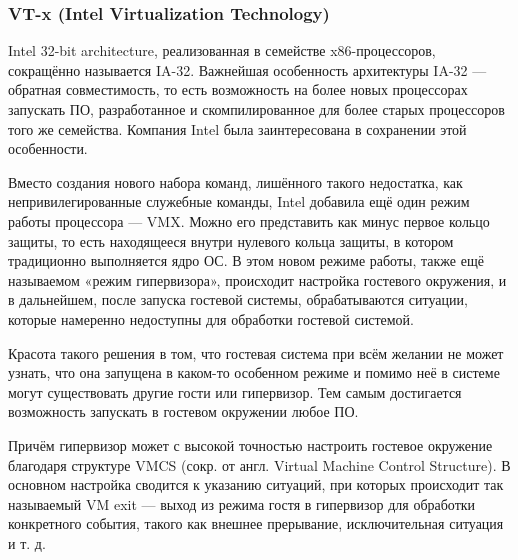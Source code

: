 \documentclass[14pt, a4paper]{article}
\begin{document}
\subsubsection*{\textbf{VT-x (Intel Virtualization Technology)}}

Intel 32-bit architecture, реализованная в семействе x86-процессоров, сокращённо называется IA-32.
Важнейшая особенность архитектуры IA-32 — обратная совместимость, то есть возможность на
более новых процессорах запускать ПО, разработанное и скомпилированное для более старых
процессоров того же семейства. Компания Intel была заинтересована в сохранении этой особенности.

Вместо создания нового набора команд, лишённого такого недостатка, как непривилегированные
служебные команды, Intel добавила ещё один режим работы процессора — VMX. Можно его
представить как минус первое кольцо защиты, то есть находящееся внутри нулевого кольца защиты, в
котором традиционно выполняется ядро ОС. В этом новом режиме работы, также ещё называемом
«режим гипервизора», происходит настройка гостевого окружения, и в дальнейшем, после запуска
гостевой системы, обрабатываются ситуации, которые намеренно недоступны для обработки гостевой
системой.

\begin{figure}[h]%
    \centering
    \label{framework} %
\end{figure}

Красота такого решения в том, что гостевая система при всём желании не может узнать, что она
запущена в каком-то особенном режиме и помимо неё в системе могут существовать другие гости или
гипервизор. Тем самым достигается возможность запускать в гостевом окружении любое ПО.

Причём гипервизор может с высокой точностью настроить гостевое окружение благодаря структуре
VMCS (сокр. от англ. Virtual Machine Control Structure). В основном настройка сводится к указанию
ситуаций, при которых происходит так называемый VM exit — выход из режима гостя в гипервизор для
обработки конкретного события, такого как внешнее прерывание, исключительная ситуация и т. д.
\end{document}
